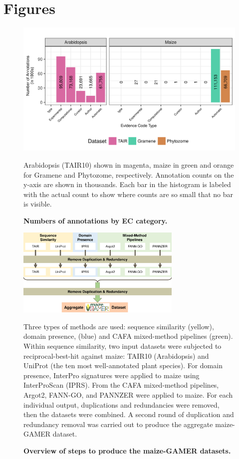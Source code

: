 \section{Figures}

\begin{figure}[htp]
  \centering
  \includegraphics[width=\textwidth]{figures/figure1/all_annots.png}
  \caption{\textbf{Numbers of annotations by EC category.}}
  \raggedright
  Arabidopsis (TAIR10) shown in magenta, maize in green and orange for Gramene and Phytozome, respectively. Annotation counts on the y-axis are shown in thousands. Each bar in the histogram is labeled with the actual count to show where counts are so small that no bar is visible.
  \label{fig:num_annots}
\end{figure}


\begin{figure}[htp]
  \centering
  \includegraphics[width=0.7\textwidth]{figures/figure2/methods-1.png}
  \caption{\textbf{Overview of steps to produce the maize-GAMER datasets.}}
  \raggedright
  Three types of methods are used: sequence similarity (yellow), domain presence, (blue) and CAFA mixed-method pipelines (green). Within sequence similarity, two input datasets were subjected to reciprocal-best-hit against maize: TAIR10 (Arabidopsis) and UniProt (the ten most well-annotated plant species).  For domain presence, InterPro signatures were applied to maize using InterProScan (IPRS). From the CAFA mixed-method pipelines, Argot2, FANN-GO, and PANNZER were applied to maize. For each individual output, duplications and redundancies were removed, then the datasets were combined. A second round of duplication and redundancy removal was carried out to produce the aggregate maize-GAMER dataset.
  \label{fig:methods}
\end{figure}

